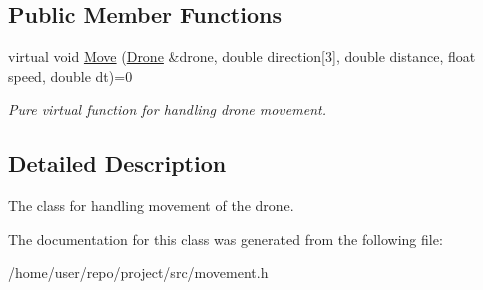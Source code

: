 \subsection*{Public Member Functions}
\begin{DoxyCompactItemize}
\item 
\mbox{\label{classMovement_abfc624b2a9b15f9700c8684b5a079ba9}} 
virtual void \hyperlink{classMovement_abfc624b2a9b15f9700c8684b5a079ba9}{Move} (\hyperlink{classDrone}{Drone} \&drone, double direction\mbox{[}3\mbox{]}, double distance, float speed, double dt)=0
\begin{DoxyCompactList}\small\item\em Pure virtual function for handling drone movement. \end{DoxyCompactList}\end{DoxyCompactItemize}


\subsection{Detailed Description}
The class for handling movement of the drone. 

The documentation for this class was generated from the following file\+:\begin{DoxyCompactItemize}
\item 
/home/user/repo/project/src/movement.\+h\end{DoxyCompactItemize}
